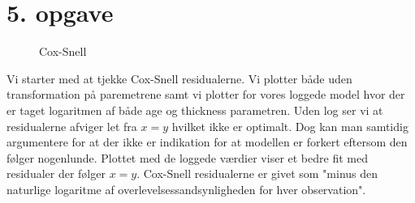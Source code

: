 \chapter{5. opgave}
\begin{figure}[h]
    \centering
    \hfill
    \hfill
    \caption{Cox-Snell}
    \label{fig:enter-label}
\end{figure}
Vi starter med at tjekke Cox-Snell residualerne. Vi plotter både uden transformation på paremetrene samt vi plotter for vores loggede model hvor der er taget logaritmen af både age og thickness parametren. Uden log ser vi at residualerne afviger let fra $x=y$ hvilket ikke er optimalt. Dog kan man samtidig argumentere for at der ikke er indikation for at modellen er forkert eftersom den følger nogenlunde. Plottet med de loggede værdier viser et bedre fit med residualer der følger $x=y$. Cox-Snell residualerne er givet som "minus den naturlige logaritme af overlevelsessandsynligheden for hver observation".\\\\

